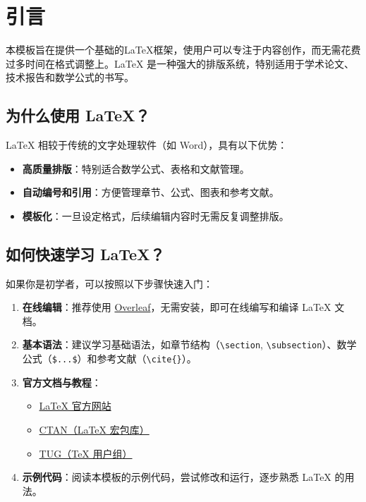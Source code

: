 \documentclass{article}
\begin{document}
\tableofcontents
\thispagestyle{plain}
 \thispagestyle{fancy}
\clearpage
{}

\section{引言}

本模板旨在提供一个基础的\LaTeX{}框架，使用户可以专注于内容创作，而无需花费过多时间在格式调整上。\LaTeX{} 是一种强大的排版系统，特别适用于学术论文、技术报告和数学公式的书写。

\subsection{为什么使用 \LaTeX{}？}
\LaTeX{} 相较于传统的文字处理软件（如 Word），具有以下优势：
\begin{itemize}
    \item \textbf{高质量排版}：特别适合数学公式、表格和文献管理。
    \item \textbf{自动编号和引用}：方便管理章节、公式、图表和参考文献。
    \item \textbf{模板化}：一旦设定格式，后续编辑内容时无需反复调整排版。
\end{itemize}

\subsection{如何快速学习 \LaTeX{}？}
如果你是初学者，可以按照以下步骤快速入门：
\begin{enumerate}
    \item \textbf{在线编辑}：推荐使用 \href{https://www.overleaf.com}{Overleaf}，无需安装，即可在线编写和编译 \LaTeX{} 文档。
    \item \textbf{基本语法}：建议学习基础语法，如章节结构（\verb|\section|, \verb|\subsection|）、数学公式（\verb|$...$|）和参考文献（\verb|\cite{}|）。
    \item \textbf{官方文档与教程}：
        \begin{itemize}
            \item \href{https://www.latex-project.org}{\LaTeX{} 官方网站}
            \item \href{https://www.ctan.org}{CTAN（\LaTeX{} 宏包库）}
            \item \href{https://tug.org}{TUG（\TeX{} 用户组）}
        \end{itemize}
    \item \textbf{示例代码}：阅读本模板的示例代码，尝试修改和运行，逐步熟悉 \LaTeX{} 的用法。
\end{enumerate}
\end{document}
